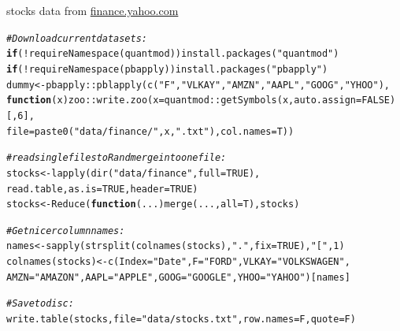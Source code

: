 \documentclass[xcolor=table,       handout,    xcolor=dvipsnames]{beamer}\usepackage[]{graphicx}\usepackage[]{color}
\makeatletter
\newcommand{\hlnum}[1]{\textcolor[rgb]{0,0,0}{#1}}
\newcommand{\hlstr}[1]{\textcolor[rgb]{0.545,0.137,0.137}{#1}}
\newcommand{\hlcom}[1]{\textcolor[rgb]{0,0.392,0}{\textit{#1}}}
\newcommand{\hlopt}[1]{\textcolor[rgb]{0,0,0}{#1}}
\newcommand{\hlstd}[1]{\textcolor[rgb]{0,0,0}{#1}}
\newcommand{\hlkwa}[1]{\textcolor[rgb]{1,0,0}{\textbf{#1}}}
\newcommand{\hlkwb}[1]{\textcolor[rgb]{0,0,0}{#1}}
\newcommand{\hlkwc}[1]{\textcolor[rgb]{1,0,1}{#1}}
\newcommand{\hlkwd}[1]{\textcolor[rgb]{0,0,1}{#1}}
\newenvironment{kframe}{%
 \def\at@end@of@kframe{}%
 \ifinner\ifhmode%
  \def\at@end@of@kframe{\end{minipage}}%
  \begin{minipage}{\columnwidth}%
 \fi\fi%
 \def\FrameCommand##1{\hskip\@totalleftmargin \hskip-\fboxsep
 \colorbox{shadecolor}{##1}\hskip-\fboxsep
     \hskip-\linewidth \hskip-\@totalleftmargin \hskip\columnwidth}%
 \MakeFramed {\advance\hsize-\width
   \@totalleftmargin\z@ \linewidth\hsize
   \@setminipage}}%
 {\par\unskip\endMakeFramed%
 \at@end@of@kframe}
\newenvironment{knitrout}{}{} %
\makeatother
\begin{document}
\begin{frame}[fragile]{stocks data from \href{http://finance.yahoo.com}{finance.yahoo.com}}
\begin{knitrout}\scriptsize
{}\color{fgcolor}\begin{kframe}
\begin{alltt}
\hlcom{# Download current datasets:}
\hlkwa{if}\hlstd{(}\hlopt{!}\hlkwd{requireNamespace}\hlstd{(quantmod))} \hlkwd{install.packages}\hlstd{(}\hlstr{"quantmod"}\hlstd{)}
\hlkwa{if}\hlstd{(}\hlopt{!}\hlkwd{requireNamespace}\hlstd{(pbapply))}  \hlkwd{install.packages}\hlstd{(}\hlstr{"pbapply"}\hlstd{)}
\hlstd{dummy} \hlkwb{<-} \hlstd{pbapply}\hlopt{::}\hlkwd{pblapply}\hlstd{(}\hlkwd{c}\hlstd{(}\hlstr{"F"}\hlstd{,}\hlstr{"VLKAY"}\hlstd{,} \hlstr{"AMZN"}\hlstd{,}\hlstr{"AAPL"}\hlstd{,}\hlstr{"GOOG"}\hlstd{,}\hlstr{"YHOO"}\hlstd{),}
   \hlkwa{function}\hlstd{(}\hlkwc{x}\hlstd{) zoo}\hlopt{::}\hlkwd{write.zoo}\hlstd{(}\hlkwc{x}\hlstd{=quantmod}\hlopt{::}\hlkwd{getSymbols}\hlstd{(x,} \hlkwc{auto.assign}\hlstd{=}\hlnum{FALSE}\hlstd{)[,}\hlnum{6}\hlstd{],}
                           \hlkwc{file}\hlstd{=}\hlkwd{paste0}\hlstd{(}\hlstr{"data/finance/"}\hlstd{,x,}\hlstr{".txt"}\hlstd{),} \hlkwc{col.names}\hlstd{=T))}

\hlcom{# read single files to R and merge into one file:}
\hlstd{stocks} \hlkwb{<-} \hlkwd{lapply}\hlstd{(}\hlkwd{dir}\hlstd{(}\hlstr{"data/finance"}\hlstd{,} \hlkwc{full}\hlstd{=}\hlnum{TRUE}\hlstd{),}
                  \hlstd{read.table,} \hlkwc{as.is}\hlstd{=}\hlnum{TRUE}\hlstd{,} \hlkwc{header}\hlstd{=}\hlnum{TRUE}\hlstd{)}
\hlstd{stocks} \hlkwb{<-} \hlkwd{Reduce}\hlstd{(}\hlkwa{function}\hlstd{(}\hlkwc{...}\hlstd{)} \hlkwd{merge}\hlstd{(...,} \hlkwc{all}\hlstd{=T), stocks)}

\hlcom{# Get nicer column names:}
\hlstd{names} \hlkwb{<-} \hlkwd{sapply}\hlstd{(}\hlkwd{strsplit}\hlstd{(}\hlkwd{colnames}\hlstd{(stocks),} \hlstr{"."}\hlstd{,} \hlkwc{fix}\hlstd{=}\hlnum{TRUE}\hlstd{),}\hlstr{"["}\hlstd{,} \hlnum{1}\hlstd{)}
\hlkwd{colnames}\hlstd{(stocks)} \hlkwb{<-} \hlkwd{c}\hlstd{(}\hlkwc{Index}\hlstd{=}\hlstr{"Date"}\hlstd{,} \hlkwc{F}\hlstd{=}\hlstr{"FORD"}\hlstd{,} \hlkwc{VLKAY}\hlstd{=}\hlstr{"VOLKSWAGEN"}\hlstd{,}
              \hlkwc{AMZN}\hlstd{=}\hlstr{"AMAZON"}\hlstd{,} \hlkwc{AAPL}\hlstd{=}\hlstr{"APPLE"}\hlstd{,} \hlkwc{GOOG}\hlstd{=}\hlstr{"GOOGLE"}\hlstd{,} \hlkwc{YHOO}\hlstd{=}\hlstr{"YAHOO"}\hlstd{)[names]}

\hlcom{# Save to disc:}
\hlkwd{write.table}\hlstd{(stocks,} \hlkwc{file}\hlstd{=}\hlstr{"data/stocks.txt"}\hlstd{,} \hlkwc{row.names}\hlstd{=F,} \hlkwc{quote}\hlstd{=F)}
\end{alltt}
\end{kframe}
\end{knitrout}
\end{frame}
\end{document}
